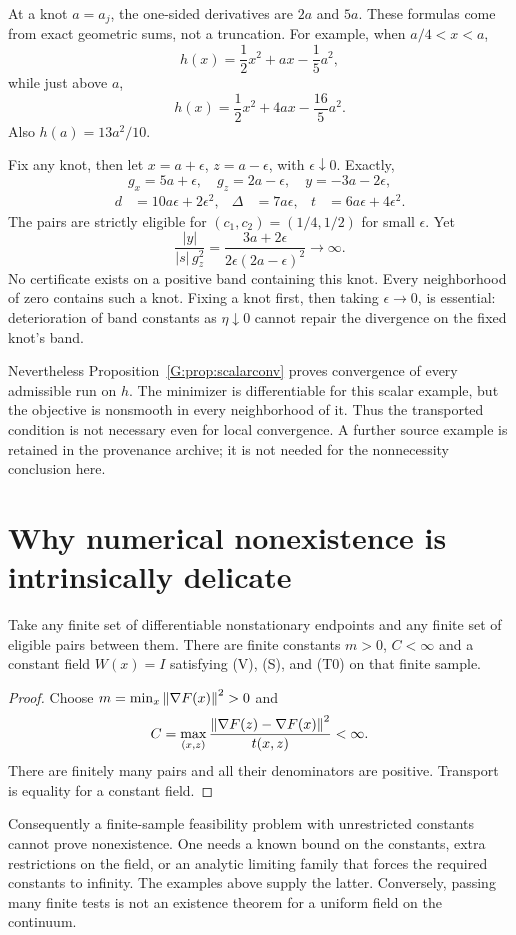 At a knot $a=a_j$, the one-sided derivatives are $2a$ and $5a$. These formulas come from exact geometric sums, not a truncation. For example, when $a/4<x<a$,
\[
 h(x)=\frac12x^2+ax-\frac15a^2,
\]
while just above $a$,
\[
 h(x)=\frac12x^2+4ax-\frac{16}{5}a^2.
\]
Also $h(a)=13a^2/10$.

Fix any knot, then let $x=a+\epsilon$, $z=a-\epsilon$, with $\epsilon\downarrow0$. Exactly,
\[
 g_x=5a+\epsilon,\quad g_z=2a-\epsilon,\quad y=-3a-2\epsilon,
\]
\begin{align*}
 d&=10a\epsilon+2\epsilon^2,&
 \Delta&=7a\epsilon,&
 t&=6a\epsilon+4\epsilon^2.
\end{align*}
The pairs are strictly eligible for $(c_1,c_2)=(1/4,1/2)$ for small $\epsilon$. Yet
\[
 \frac{|y|}{|s|\,g_z^2}
 =\frac{3a+2\epsilon}{2\epsilon(2a-\epsilon)^2}\longrightarrow\infty.
\]
No certificate exists on a positive band containing this knot. Every neighborhood of zero contains such a knot. Fixing a knot first, then taking $\epsilon\to0$, is essential: deterioration of band constants as $\eta\downarrow0$ cannot repair the divergence on the fixed knot's band.

Nevertheless Proposition~\ref{G:prop:scalarconv} proves convergence of every admissible run on $h$. The minimizer is differentiable for this scalar example, but the objective is nonsmooth in every neighborhood of it. Thus the transported condition is not necessary even for local convergence. A further source example is retained in the provenance archive; it is not needed for the nonnecessity conclusion here.


\setcounter{section}{8}
\setcounter{theorem}{0}
\setcounter{equation}{8}
\section{Why numerical nonexistence is intrinsically delicate}
\begin{proposition}
Take any finite set of differentiable nonstationary endpoints and any finite set of eligible pairs between them. There are finite constants $m>0$, $C<\infty$ and a constant field $W(x)=I$ satisfying (V), (S), and (T0) on that finite sample.
\end{proposition}
\begin{proof}
Choose $m=\min_x\left\|\nabla F(x)\right\|^2>0$ and
\[
 C=\max_{(x,z)}\frac{\left\|\nabla F(z)-\nabla F(x)\right\|^2}{t(x,z)}<\infty.
\]
There are finitely many pairs and all their denominators are positive. Transport is equality for a constant field.
\end{proof}
Consequently a finite-sample feasibility problem with unrestricted constants cannot prove nonexistence. One needs a known bound on the constants, extra restrictions on the field, or an analytic limiting family that forces the required constants to infinity. The examples above supply the latter. Conversely, passing many finite tests is not an existence theorem for a uniform field on the continuum.


\endgroup
